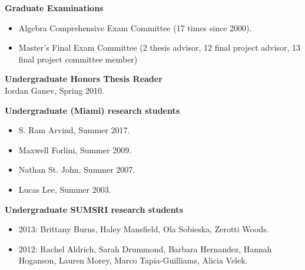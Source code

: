 \documentclass[overlapped,line,letterpaper]{res}
\begin{document}
\begin{resume}
\begin{itemize}
\end{itemize}



{\bf Graduate Examinations}

\begin{itemize}

\item
Algebra Comprehensive Exam Committee (17 times since 2000).

\item
Master's Final Exam Committee (2 thesis advisor, 12 final project advisor, 13 final project committee member)


\end{itemize}

{\bf  Undergraduate Honors Thesis Reader}\\
Iordan Ganev, Spring 2010.





{\bf Undergraduate (Miami) research students}

\begin{itemize}
\item
S. Ram Arvind, Summer 2017.

\item
Maxwell Forlini, Summer 2009.

\item
Nathan St. John, Summer 2007.

\item
Lucas Lee, Summer 2003.
\end{itemize}

\newpage

{\bf Undergraduate SUMSRI research students}

\begin{itemize}


\item
2013: Brittany Burns, Haley Mansfield, Ola Sobieska, Zerotti Woods.

\item
2012: Rachel Aldrich, Sarah Drummond, Barbara Hernandez, Hannah Hoganson, Lauren 
Morey, Marco Tapia-Guilliams, Alicia Velek.


\end{itemize}
\end{resume}
\end{document}
